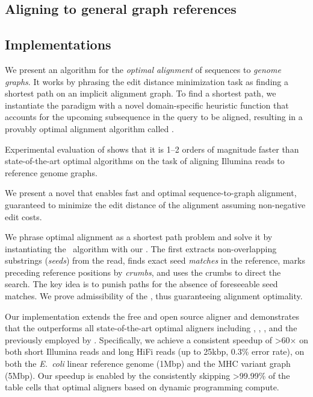 \subsection*{Aligning to general graph references}

\subsection*{Implementations}

	
We present an algorithm for the \emph{optimal alignment} of sequences to
\emph{genome graphs}. It works by phrasing the edit distance minimization
task as finding a shortest path on an implicit alignment graph. To find a
shortest path, we instantiate the \A paradigm with a novel domain-specific
heuristic function that accounts for the upcoming subsequence in the query
to be aligned, resulting in a provably optimal alignment algorithm called
\astarix.

Experimental evaluation of \astarix shows that it is 1--2 orders of magnitude
faster than state-of-the-art optimal algorithms on the task of aligning Illumina
reads to reference genome graphs.

We present a novel \A \emph{\seedh} that enables fast and optimal
sequence-to-graph alignment, guaranteed to minimize the edit distance of the
alignment assuming non-negative edit costs.

We phrase optimal alignment as a shortest path problem and solve it by
instantiating the \A~algorithm with our \seedh. The \seedh first extracts
non-overlapping substrings (\emph{seeds}) from the read, finds exact seed
\emph{matches} in the reference, marks preceding reference positions by
\emph{crumbs}, and uses the crumbs to direct the \A search. The key idea is to
punish paths for the absence of foreseeable seed matches. We prove admissibility
of the \seedh, thus guaranteeing alignment optimality.

Our implementation extends the free and open source aligner and demonstrates
that the \seedh outperforms all state-of-the-art optimal aligners including
\graphaligner, \vargas, \pasgal, and the \prefixh previously employed by
\astarix. Specifically, we achieve a consistent speedup of >60$\times$ on both
short Illumina reads and long HiFi reads (up to 25kbp, 0.3\% error rate), on
both the \textit{E.~coli} linear reference genome (1Mbp) and the MHC variant
graph (5Mbp). Our speedup is enabled by the \seedh consistently skipping
>99.99\% of the table cells that optimal aligners based on dynamic programming
compute.

